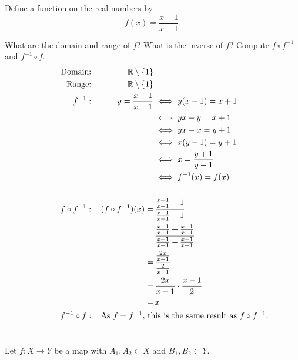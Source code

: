 \section{}\label{sec:23}

Define a function on the real numbers by
\[f(x) = \frac{x + 1}{x - 1}.\]

What are the domain and range of $f$? What is the inverse of $f$? Compute $f \circ f^{-1}$ and $f^{-1} \circ f$.
\hr
\begin{alignat*}{5}
    \text{Domain:}  && \mathbb{R} \setminus \{1\} \\
    \text{Range:}  && \mathbb{R} \setminus \{1\} \\
    f^{-1}: &&\,y = \frac{x+1}{x-1} &\iff y(x-1) = x+1 \\
            &&&\iff yx-y = x+1 \\
            &&&\iff yx-x = y+1 \\
            &&&\iff x(y-1) = y+1 \\
            &&&\iff x = \frac{y+1}{y-1} \\
            &&&\iff f^{-1}(x) = f(x) \\
    \\
    f \circ f^{-1}: &&\,(f \circ f^{-1})(x) = &\,\frac{\frac{x+1}{x-1}+1}{\frac{x+1}{x-1}-1} \\
                    &&= &\,\frac{\frac{x+1}{x-1}+\frac{x-1}{x-1}}{\frac{x+1}{x-1}-\frac{x-1}{x-1}} \\
                    &&= &\,\frac{\frac{2x}{x-1}}{\frac{2}{x-1}} \\
                    &&= &\,\frac{2x}{x-1} \cdot \frac{x-1}{2} \\
                    &&= &\,x \\
    f^{-1} \circ f: &&\omit\,\rlap{As $f = f^{-1}$, this is the same result as $f \circ f^{-1}$.}
\end{alignat*}

\section{}\label{sec:24}

Let $f:X \rightarrow Y$ be a map with $A_1, A_2 \subset X$ and $B_1, B_2 \subset Y$.

